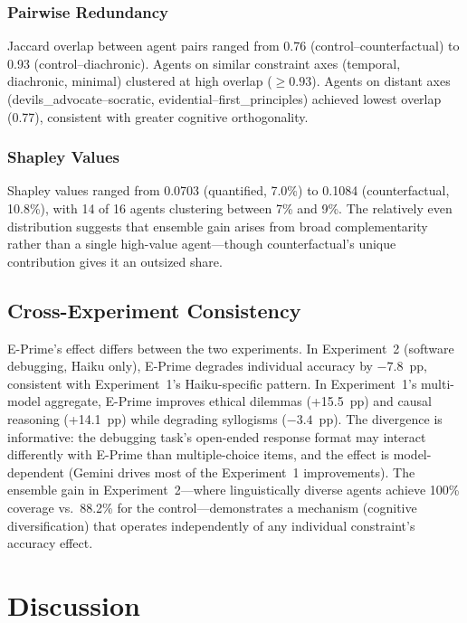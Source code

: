 \documentclass[11pt,a4paper]{article}
\begin{document}
\subsubsection{Pairwise Redundancy}

Jaccard overlap between agent pairs ranged from 0.76 (control--counterfactual) to 0.93 (control--diachronic). Agents on similar constraint axes (temporal, diachronic, minimal) clustered at high overlap ($\geq 0.93$). Agents on distant axes (devils\_advocate--socratic, evidential--first\_principles) achieved lowest overlap (0.77), consistent with greater cognitive orthogonality.

\subsubsection{Shapley Values}

Shapley values ranged from 0.0703 (quantified, 7.0\%) to 0.1084 (counterfactual, 10.8\%), with 14 of 16 agents clustering between 7\% and 9\%. The relatively even distribution suggests that ensemble gain arises from broad complementarity rather than a single high-value agent---though counterfactual's unique contribution gives it an outsized share.

\subsection{Cross-Experiment Consistency}

E-Prime's effect differs between the two experiments. In Experiment~2 (software debugging, Haiku only), E-Prime degrades individual accuracy by $-7.8$~pp, consistent with Experiment~1's Haiku-specific pattern. In Experiment~1's multi-model aggregate, E-Prime improves ethical dilemmas (+15.5~pp) and causal reasoning (+14.1~pp) while degrading syllogisms ($-3.4$~pp). The divergence is informative: the debugging task's open-ended response format may interact differently with E-Prime than multiple-choice items, and the effect is model-dependent (Gemini drives most of the Experiment~1 improvements). The ensemble gain in Experiment~2---where linguistically diverse agents achieve 100\% coverage vs.\ 88.2\% for the control---demonstrates a mechanism (cognitive diversification) that operates independently of any individual constraint's accuracy effect.

\section{Discussion}
\end{document}
